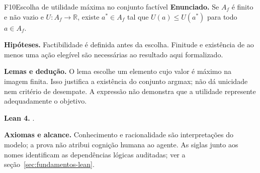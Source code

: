 \begin{formalizacao}{F10}{Escolha de utilidade máxima no conjunto factível}
\textbf{Enunciado.} Se $A_f$ é finito e não vazio e $U:A_f\to\mathbb{R}$, existe $a^*\in A_f$ tal que $U(a)\leq U(a^*)$ para todo $a\in A_f$.

\textbf{Hipóteses.} Factibilidade é definida antes da escolha. Finitude e existência de ao menos uma ação elegível são necessárias ao resultado aqui formalizado.

\textbf{Lemas e dedução.} O lema  escolhe um elemento cujo valor é máximo na imagem finita. Isso justifica a existência do conjunto argmax; não dá unicidade nem critério de desempate. A expressão não demonstra que a utilidade represente adequadamente o objetivo.

\textbf{Lean 4.} .

\textbf{Axiomas e alcance.} Conhecimento e racionalidade são interpretações do modelo; a prova não atribui cognição humana ao agente. As siglas junto aos nomes identificam as dependências lógicas auditadas; ver a seção~\ref{sec:fundamentos-lean}.
\end{formalizacao}


